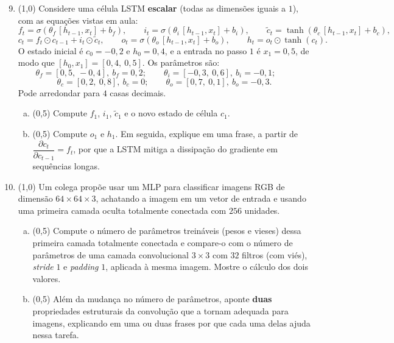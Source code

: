 \documentclass[11pt,a4paper]{article}
\begin{document}
\begin{enumerate}[1)]
\setcounter{enumi}{8}

\item (1{,}0) Considere uma célula LSTM \textbf{escalar} (todas as dimensões iguais a $1$), com as equações vistas em aula:
\[
f_t = \sigma(\theta_f\,[h_{t-1}, x_t] + b_f), \qquad
i_t = \sigma(\theta_i\,[h_{t-1}, x_t] + b_i), \qquad
\tilde{c}_t = \tanh(\theta_c\,[h_{t-1}, x_t] + b_c),
\]
\[
c_t = f_t \odot c_{t-1} + i_t \odot \tilde{c}_t, \qquad
o_t = \sigma(\theta_o\,[h_{t-1}, x_t] + b_o), \qquad
h_t = o_t \odot \tanh(c_t).
\]
O estado inicial é $c_0 = -0{,}2$ e $h_0 = 0{,}4$, e a entrada no passo $1$ é $x_1 = 0{,}5$, de modo que $[h_0, x_1] = [0{,}4,\ 0{,}5]$. Os parâmetros são:
\[
\theta_f = [0{,}5,\ -0{,}4],\ b_f = 0{,}2; \qquad
\theta_i = [-0{,}3,\ 0{,}6],\ b_i = -0{,}1; \qquad
\]
\[
\theta_c = [0{,}2,\ 0{,}8],\ b_c = 0; \qquad
\theta_o = [0{,}7,\ 0{,}1],\ b_o = -0{,}3.
\]
Pode arredondar para $4$ casas decimais.

\begin{enumerate}[a)]
    \item (0{,}5) Compute $f_1$, $i_1$, $\tilde{c}_1$ e o novo estado de célula $c_1$.
    \vspace{3.4cm}

    \item (0{,}5) Compute $o_1$ e $h_1$. Em seguida, explique em uma frase, a partir de $\dfrac{\partial c_t}{\partial c_{t-1}} = f_t$, por que a LSTM mitiga a dissipação do gradiente em sequências longas.
    \vspace{3.4cm}
\end{enumerate}

\item (1{,}0) Um colega propõe usar um MLP para classificar imagens RGB de dimensão $64 \times 64 \times 3$, achatando a imagem em um vetor de entrada e usando uma primeira camada oculta totalmente conectada com $256$ unidades.

\begin{enumerate}[a)]
    \item (0{,}5) Compute o número de parâmetros treináveis (pesos e vieses) dessa primeira camada totalmente conectada e compare-o com o número de parâmetros de uma camada convolucional $3 \times 3$ com $32$ filtros (com viés), \textit{stride} $1$ e \textit{padding} $1$, aplicada à mesma imagem. Mostre o cálculo dos dois valores.
    \vspace{3.4cm}

    \item (0{,}5) Além da mudança no número de parâmetros, aponte \textbf{duas} propriedades estruturais da convolução que a tornam adequada para imagens, explicando em uma ou duas frases por que cada uma delas ajuda nessa tarefa.
    \vspace{3.4cm}
\end{enumerate}

\end{enumerate}
\end{document}

